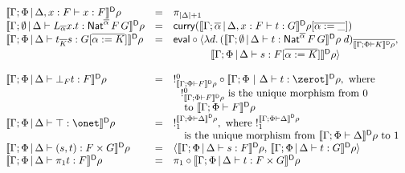 \documentclass{lmcs}
\theoremstyle{plain}\newtheorem{satz}[thm]{Satz}
\begin{document}
{\begin{figure*}
\begin{adjustbox}{varwidth=7.2in, max width=5.8in, fbox, center}
\[\begin{array}{lll}
\dsem{\Gamma;\Phi \,|\, \Delta,x :F \vdash x : F} \rho& = &
\pi_{|\Delta|+1}\\
\dsem{\Gamma;\emptyset \,|\, \Delta \vdash L_{\overline \alpha} x.t :
  \Nat^{\overline 
    \alpha} \,F \,G}\rho & = &  \curry (\dsem{\Gamma;\overline \alpha
  \,|\, \Delta, x : F \vdash t: G}\rho[\overline{\alpha := \_}])\\
\dsem{\Gamma;\Phi \,|\, \Delta \vdash t_{\overline K} s:
  G [\overline{\alpha := K}]}\rho & = & \eval \circ \langle
  \lambda d.\,(\dsem{\Gamma;\emptyset \,|\, \Delta \vdash t :
  \Nat^{\overline{\alpha}} \,F \,G}\rho\; d)_{\overline{\dsem{\Gamma;\Phi
      \vdash K}\rho}},\\ 
 & & \hspace*{0.5in} \dsem{\Gamma;\Phi \,|\,
    \Delta \vdash s: F [\overline{\alpha := K}]}\rho \rangle\\ 
& & \\
\dsem{\Gamma;\Phi \,|\, \Delta \vdash \bot_F t : F} \rho& = &
!^0_{\dsem{\Gamma;\Phi \vdash F}\rho} \circ
  \dsem{\Gamma;\Phi~|~\Delta \vdash t : \zerot}\rho, \mbox{ where } \\
 & & \hspace*{0.1in} !^0_{\dsem{\Gamma;\Phi \vdash F}\rho}
\mbox{ is the unique morphism from } 0\\
 & & \hspace*{0.1in} \mbox{ to } \dsem{\Gamma;\Phi \vdash F}\rho\\
\dsem{\Gamma;\Phi \,|\, \Delta \vdash \top : \onet}\rho & = &
!^{\dsem{\Gamma;\Phi\vdash \Delta}\rho}_1, \mbox{ where }
!^{\dsem{\Gamma;\Phi\vdash \Delta}\rho}_1\\ 
& & \hspace*{0.1in} \mbox{ is the unique morphism from }
\dsem{\Gamma;\Phi\vdash \Delta}\rho \mbox{ to } 1\\ 
\dsem{\Gamma;\Phi \,|\, \Delta \vdash (s,t) : F \times G} \rho& = &
\langle \dsem{\Gamma;\Phi \,|\, \Delta \vdash s: F} \rho,\,
\dsem{\Gamma;\Phi \,|\, \Delta \vdash t : G} \rho\rangle\\
\dsem{\Gamma;\Phi \,|\, \Delta \vdash \pi_1 t : F} \rho& = &
\pi_1 \circ \dsem{\Gamma;\Phi \,|\, \Delta \vdash t : F \times G}\rho\\

\end{array}\]
\end{adjustbox}
\end{figure*}}
\end{document}
